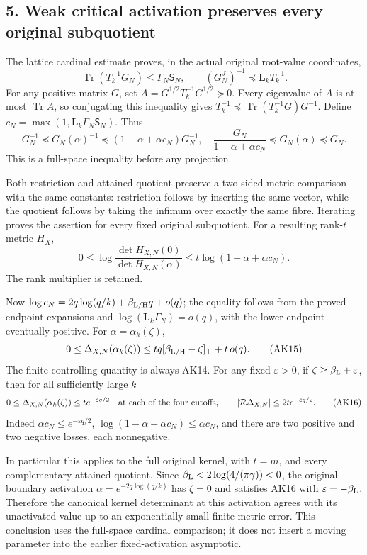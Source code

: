 \documentclass[11pt]{article}
\begin{document}
\subsection{5. Weak critical activation preserves every original subquotient}\label{weak-critical-activation-preserves-every-original-subquotient}

The lattice cardinal estimate proves, in the actual original root-value coordinates, \[
\operatorname{Tr}(T_k^{-1}G_N)\le\Gamma_N\mathsf S_N,\qquad
(G_N^J)^{-1}\preceq\mathbf L_kT_k^{-1}.
\] For any positive matrix \(G\), set \(A=G^{1/2}T_k^{-1}G^{1/2}\succeq0\). Every eigenvalue of \(A\) is at most \(\operatorname{Tr}A\), so conjugating this inequality gives \(T_k^{-1}\preceq\operatorname{Tr}(T_k^{-1}G)G^{-1}\). Define \(c_N=\max(1,\mathbf L_k\Gamma_N\mathsf S_N)\). Thus \[
G_N^{-1}\preceq G_N(\alpha)^{-1}
 \preceq(1-\alpha+\alpha c_N)G_N^{-1},
\quad
\frac{G_N}{1-\alpha+\alpha c_N}
 \preceq G_N(\alpha)\preceq G_N.
\tag{AK13}
\] This is a full-space inequality before any projection.

Both restriction and attained quotient preserve a two-sided metric comparison with the same constants: restriction follows by inserting the same vector, while the quotient follows by taking the infimum over exactly the same fibre. Iterating proves the assertion for every fixed original subquotient. For a resulting rank-\(t\) metric \(H_X\), \[
0\le\log\frac{\det H_{X,N}(0)}{\det H_{X,N}(\alpha)}
\le t\log(1-\alpha+\alpha c_N).
\tag{AK14}
\] The rank multiplier is retained.

Now \(\log c_N=2q\log(q/k)+\beta_{\rm L/H}q+o(q)\); the equality follows from the proved endpoint expansions and \(\log(\mathbf L_k\Gamma_N)=o(q)\), with the lower endpoint eventually positive. For \(\alpha=\alpha_k(\zeta)\), \[
0\le\Delta_{X,N}(\alpha_k(\zeta))
\le tq[\beta_{\rm L/H}-\zeta]_++t\,o(q).
\tag{AK15}
\] The finite controlling quantity is always AK14. For any fixed \(\varepsilon>0\), if \(\zeta\ge\beta_{\rm L}+\varepsilon\), then for all sufficiently large \(k\) \[
0\le\Delta_{X,N}(\alpha_k(\zeta))\le t e^{-\varepsilon q/2}
\quad\hbox{at each of the four cutoffs},\qquad
|\mathcal R\Delta_{X,N}|\le2t e^{-\varepsilon q/2}.
\tag{AK16}
\] Indeed \(\alpha c_N\le e^{-\varepsilon q/2}\), \(\log(1-\alpha+\alpha c_N)\le\alpha c_N\), and there are two positive and two negative losses, each nonnegative.

In particular this applies to the full original kernel, with \(t=m\), and every complementary attained quotient. Since \(\beta_{\rm L}<2\log(4/(\pi\gamma))<0\), the original boundary activation \(\alpha=e^{-2q\log(q/k)}\) has \(\zeta=0\) and satisfies AK16 with \(\varepsilon=-\beta_{\rm L}\). Therefore the canonical kernel determinant at this activation agrees with its unactivated value up to an exponentially small finite metric error. This conclusion uses the full-space cardinal comparison; it does not insert a moving parameter into the earlier fixed-activation asymptotic.
\end{document}
